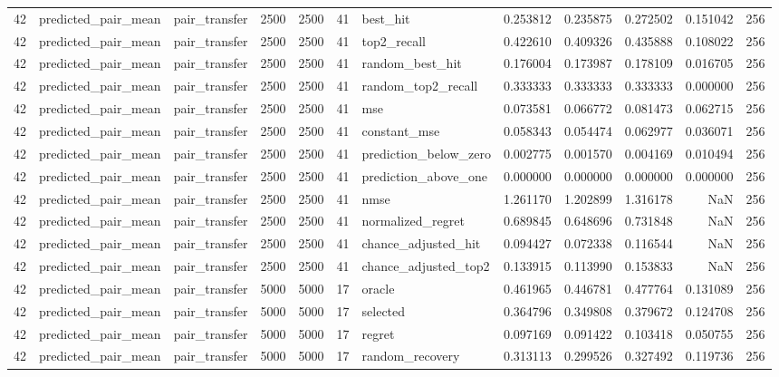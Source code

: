 \begin{tabular}{rllrrrlrrrrr}
42 & predicted_pair_mean & pair_transfer & 2500 & 2500 & 41 & best_hit & 0.253812 & 0.235875 & 0.272502 & 0.151042 & 256 \\
42 & predicted_pair_mean & pair_transfer & 2500 & 2500 & 41 & top2_recall & 0.422610 & 0.409326 & 0.435888 & 0.108022 & 256 \\
42 & predicted_pair_mean & pair_transfer & 2500 & 2500 & 41 & random_best_hit & 0.176004 & 0.173987 & 0.178109 & 0.016705 & 256 \\
42 & predicted_pair_mean & pair_transfer & 2500 & 2500 & 41 & random_top2_recall & 0.333333 & 0.333333 & 0.333333 & 0.000000 & 256 \\
42 & predicted_pair_mean & pair_transfer & 2500 & 2500 & 41 & mse & 0.073581 & 0.066772 & 0.081473 & 0.062715 & 256 \\
42 & predicted_pair_mean & pair_transfer & 2500 & 2500 & 41 & constant_mse & 0.058343 & 0.054474 & 0.062977 & 0.036071 & 256 \\
42 & predicted_pair_mean & pair_transfer & 2500 & 2500 & 41 & prediction_below_zero & 0.002775 & 0.001570 & 0.004169 & 0.010494 & 256 \\
42 & predicted_pair_mean & pair_transfer & 2500 & 2500 & 41 & prediction_above_one & 0.000000 & 0.000000 & 0.000000 & 0.000000 & 256 \\
42 & predicted_pair_mean & pair_transfer & 2500 & 2500 & 41 & nmse & 1.261170 & 1.202899 & 1.316178 & NaN & 256 \\
42 & predicted_pair_mean & pair_transfer & 2500 & 2500 & 41 & normalized_regret & 0.689845 & 0.648696 & 0.731848 & NaN & 256 \\
42 & predicted_pair_mean & pair_transfer & 2500 & 2500 & 41 & chance_adjusted_hit & 0.094427 & 0.072338 & 0.116544 & NaN & 256 \\
42 & predicted_pair_mean & pair_transfer & 2500 & 2500 & 41 & chance_adjusted_top2 & 0.133915 & 0.113990 & 0.153833 & NaN & 256 \\
42 & predicted_pair_mean & pair_transfer & 5000 & 5000 & 17 & oracle & 0.461965 & 0.446781 & 0.477764 & 0.131089 & 256 \\
42 & predicted_pair_mean & pair_transfer & 5000 & 5000 & 17 & selected & 0.364796 & 0.349808 & 0.379672 & 0.124708 & 256 \\
42 & predicted_pair_mean & pair_transfer & 5000 & 5000 & 17 & regret & 0.097169 & 0.091422 & 0.103418 & 0.050755 & 256 \\
42 & predicted_pair_mean & pair_transfer & 5000 & 5000 & 17 & random_recovery & 0.313113 & 0.299526 & 0.327492 & 0.119736 & 256 \\

\end{tabular}
